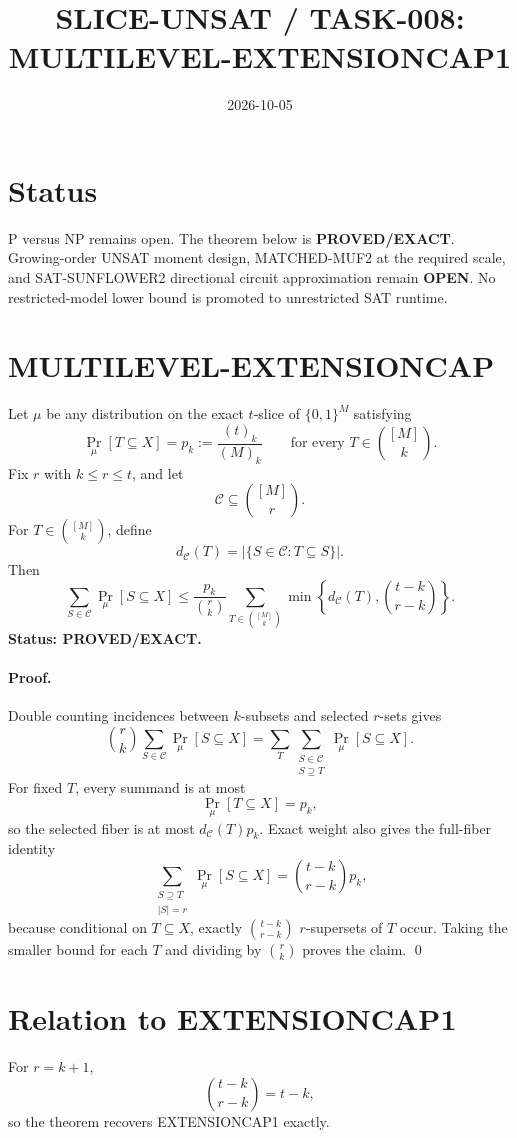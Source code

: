 \documentclass[11pt]{article}
\title{SLICE-UNSAT / TASK-008: MULTILEVEL-EXTENSIONCAP1}
\date{2026-10-05}
\begin{document}
\maketitle

\section*{Status}
P versus NP remains open. The theorem below is \textbf{PROVED/EXACT}. Growing-order UNSAT moment design, MATCHED-MUF2 at the required scale, and SAT-SUNFLOWER2 directional circuit approximation remain \textbf{OPEN}. No restricted-model lower bound is promoted to unrestricted SAT runtime.

\section*{MULTILEVEL-EXTENSIONCAP}
Let $\mu$ be any distribution on the exact $t$-slice of $\{0,1\}^M$ satisfying
\[
 \Pr_\mu[T\subseteq X]=p_k:=\frac{(t)_k}{(M)_k}
 \qquad\text{for every }T\in\binom{[M]}k.
\]
Fix $r$ with $k\le r\le t$, and let
\[
 \mathcal C\subseteq\binom{[M]}r.
\]
For $T\in\binom{[M]}k$, define
\[
 d_{\mathcal C}(T)=|\{S\in\mathcal C:T\subseteq S\}|.
\]
Then
\[
\boxed{
\sum_{S\in\mathcal C}\Pr_\mu[S\subseteq X]
\le
\frac{p_k}{\binom rk}
\sum_{T\in\binom{[M]}k}
\min\left\{
d_{\mathcal C}(T),\binom{t-k}{r-k}
\right\}.
}
\]
\textbf{Status: PROVED/EXACT.}

\paragraph{Proof.}
Double counting incidences between $k$-subsets and selected $r$-sets gives
\[
\binom rk\sum_{S\in\mathcal C}\Pr_\mu[S\subseteq X]
=
\sum_T\sum_{\substack{S\in\mathcal C\\S\supseteq T}}
\Pr_\mu[S\subseteq X].
\]
For fixed $T$, every summand is at most
\[
\Pr_\mu[T\subseteq X]=p_k,
\]
so the selected fiber is at most $d_{\mathcal C}(T)p_k$. Exact weight also gives the full-fiber identity
\[
\sum_{\substack{S\supseteq T\\|S|=r}}\Pr_\mu[S\subseteq X]
=
\binom{t-k}{r-k}p_k,
\]
because conditional on $T\subseteq X$, exactly $\binom{t-k}{r-k}$ $r$-supersets of $T$ occur. Taking the smaller bound for each $T$ and dividing by $\binom rk$ proves the claim. \qed

\section*{Relation to EXTENSIONCAP1}
For $r=k+1$,
\[
\binom{t-k}{r-k}=t-k,
\]
so the theorem recovers EXTENSIONCAP1 exactly.
\end{document}

